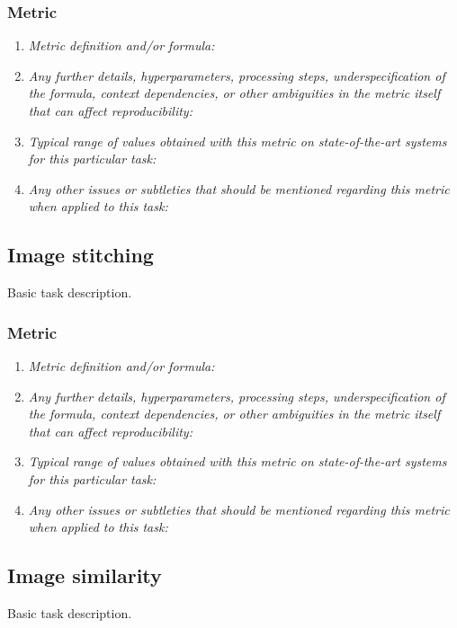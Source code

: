\documentclass[a4paper,11pt]{article}
\begin{document}
    \subsubsection{Metric}
        \begin{enumerate}[label=\alph*.]
            \item \textit{Metric definition and/or formula:}
            \bigskip
            \item \textit{Any further details, hyperparameters, processing steps, underspecification of the formula, context dependencies, or other ambiguities in the metric itself that can affect reproducibility:}
            \bigskip
            \item \textit{Typical range of values obtained with this metric on state-of-the-art systems for this particular task:}
            \bigskip
            \item \textit{Any other issues or subtleties that should be mentioned regarding this metric when applied to this task:}
            \bigskip
        \end{enumerate}
\subsection{Image stitching}
    Basic task description.
    \subsubsection{Metric}
        \begin{enumerate}[label=\alph*.]
            \item \textit{Metric definition and/or formula:}
            \bigskip
            \item \textit{Any further details, hyperparameters, processing steps, underspecification of the formula, context dependencies, or other ambiguities in the metric itself that can affect reproducibility:}
            \bigskip
            \item \textit{Typical range of values obtained with this metric on state-of-the-art systems for this particular task:}
            \bigskip
            \item \textit{Any other issues or subtleties that should be mentioned regarding this metric when applied to this task:}
            \bigskip
        \end{enumerate}

\subsection{Image similarity}
    Basic task description.
\end{document}
